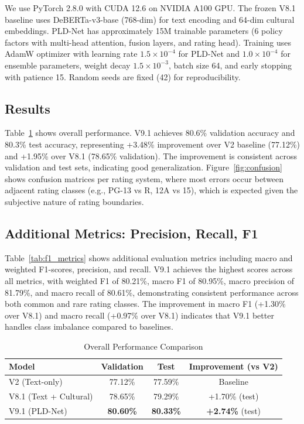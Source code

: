 \documentclass[11pt]{article}
\begin{document}
We use PyTorch 2.8.0 with CUDA 12.6 on NVIDIA A100 GPU. The frozen V8.1 baseline uses DeBERTa-v3-base (768-dim) for text encoding and 64-dim cultural embeddings. PLD-Net has approximately 15M trainable parameters (6 policy factors with multi-head attention, fusion layers, and rating head). Training uses AdamW optimizer with learning rate $1.5 \times 10^{-4}$ for PLD-Net and $1.0 \times 10^{-4}$ for ensemble parameters, weight decay $1.5 \times 10^{-3}$, batch size 64, and early stopping with patience 15. Random seeds are fixed (42) for reproducibility.

\subsection{Results}

Table~\ref{tab:results} shows overall performance. V9.1 achieves 80.6\% validation accuracy and 80.3\% test accuracy, representing +3.48\% improvement over V2 baseline (77.12\%) and +1.95\% over V8.1 (78.65\% validation). The improvement is consistent across validation and test sets, indicating good generalization. Figure~\ref{fig:confusion} shows confusion matrices per rating system, where most errors occur between adjacent rating classes (e.g., PG-13 vs R, 12A vs 15), which is expected given the subjective nature of rating boundaries.

\subsection{Additional Metrics: Precision, Recall, F1}

Table~\ref{tab:f1_metrics} shows additional evaluation metrics including macro and weighted F1-scores, precision, and recall. V9.1 achieves the highest scores across all metrics, with weighted F1 of 80.21\%, macro F1 of 80.95\%, macro precision of 81.79\%, and macro recall of 80.61\%, demonstrating consistent performance across both common and rare rating classes. The improvement in macro F1 (+1.30\% over V8.1) and macro recall (+0.97\% over V8.1) indicates that V9.1 better handles class imbalance compared to baselines.

\begin{table}[h]
\centering
\caption{Overall Performance Comparison}
\label{tab:results}
\begin{tabular}{lccc}
\toprule
Model & Validation & Test & Improvement (vs V2) \\
\midrule
V2 (Text-only) & 77.12\% & 77.59\% & Baseline \\
V8.1 (Text + Cultural) & 78.65\% & 79.29\% & +1.70\% (test) \\
V9.1 (PLD-Net) & \textbf{80.60\%} & \textbf{80.33\%} & \textbf{+2.74\%} (test) \\
\bottomrule
\end{tabular}
\end{table}
\end{document}
